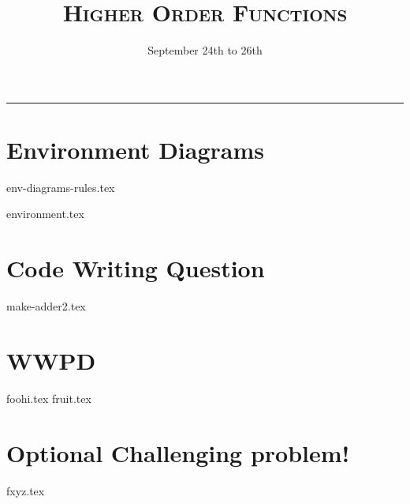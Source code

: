 \documentclass{exam}
\title{\textsc{Higher Order Functions}}
\date{September 24th to 26th}
\begin{document}
\maketitle
\rule{\textwidth}{0.15em}
\fontsize{12}{15}\selectfont



\section{Environment Diagrams}
{env-diagrams-rules.tex}
\newpage
\begin{questions}
{environment.tex}



\end{questions}


\newpage
\section{Code Writing Question}
\begin{questions}
{make-adder2.tex}

\newpage
\section{WWPD}
\begin{questions}
{foohi.tex}
\newpage
{fruit.tex}
\end{questions}

\newpage
\section{Optional Challenging problem!}
{fxyz.tex}

\end{questions}
\end{document}
